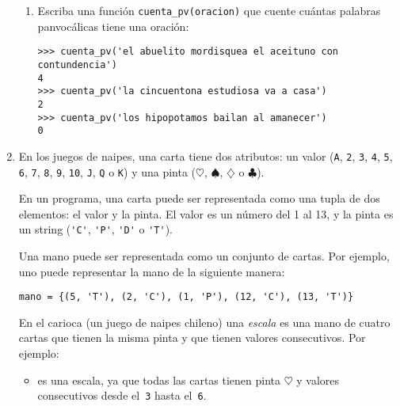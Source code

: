 \documentclass[10pt,spanish]{article}
\newcommand{\cv}{\texttt}
\begin{document}
\begin{enumerate}
\begin{enumerate}
        \item
          Escriba una función \lstinline!cuenta_pv(oracion)!
          que cuente cuántas palabras panvocálicas tiene una oración:
          \begin{lstlisting}
>>> cuenta_pv('el abuelito mordisquea el aceituno con contundencia')
4
>>> cuenta_pv('la cincuentona estudiosa va a casa')
2
>>> cuenta_pv('los hipopotamos bailan al amanecer')
0
          \end{lstlisting}

          \framebox[0.9\textwidth]{\rule[35.0ex]{0pt}{0pt}}

      \end{enumerate}


    \newpage
    \item
      En los juegos de naipes, una carta tiene dos atributos:
      un valor (\cv{A}, \cv{2}, \cv{3}, \cv{4}, \cv{5}, \cv{6}, \cv{7}, \cv{8},
                \cv{9}, \cv{10}, \cv{J}, \cv{Q} o \cv{K})
      y una pinta (\(\heartsuit\), \(\spadesuit\), \(\diamondsuit\) o \(\clubsuit\)).

      En un programa,
      una carta puede ser representada como una tupla de dos elementos:
      el valor y la pinta.
      El valor es un número del 1 al 13,
      y la pinta es un string
      (\lstinline!'C'!, \lstinline!'P'!, \lstinline!'D'! o \lstinline!'T'!).

      Una mano puede ser representada como un conjunto de cartas.
      Por ejemplo, uno puede representar la mano
      \fbox{\cv{5}\(\clubsuit\)}
      \fbox{\cv{2}\(\heartsuit\)}
      \fbox{\cv{1}\(\spadesuit\)}
      \fbox{\cv{Q}\(\heartsuit\)}
      \fbox{\cv{K}\(\clubsuit\)}
      de la siguiente manera:
      \begin{lstlisting}
mano = {(5, 'T'), (2, 'C'), (1, 'P'), (12, 'C'), (13, 'T')}
      \end{lstlisting}

      En el carioca (un juego de naipes chileno)
      una \emph{escala} es una mano de cuatro cartas
      que tienen la misma pinta y que tienen valores consecutivos.
      Por ejemplo:
      \begin{itemize}
        \item
          \fbox{\cv{3}\(\heartsuit\)}
          \fbox{\cv{6}\(\heartsuit\)}
          \fbox{\cv{5}\(\heartsuit\)}
          \fbox{\cv{4}\(\heartsuit\)}
          es una escala, ya que todas las cartas tienen pinta \(\heartsuit\)
          y valores consecutivos desde el~\cv{3} hasta el~\cv{6}.


\end{itemize}
\end{enumerate}
\end{document}
